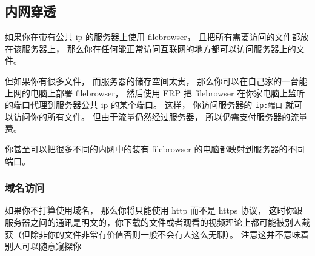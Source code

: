 \subsection{内网穿透}

如果你在带有公共 ip 的服务器上使用 filebrowser， 且把所有需要访问的文件都放在该服务器上， 那么你在任何能正常访问互联网的地方都可以访问服务器上的文件。

但如果你有很多文件， 而服务器的储存空间太贵， 那么你可以在自己家的一台能上网的电脑上部署 filebrowser， 然后使用 FRP 把 filebrowser 在你家电脑上监听的端口代理到服务器公共 ip 的某个端口。 这样， 你访问服务器的 \verb|ip:端口| 就可以访问你的所有文件。 但由于流量仍然经过服务器， 所以仍需支付服务器的流量费。

你甚至可以把很多不同的内网中的装有 filebrowser 的电脑都映射到服务器的不同端口。

\subsubsection{域名访问}
如果你不打算使用域名， 那么你将只能使用 http 而不是 https 协议， 这时你跟服务器之间的通讯是明文的，你下载的文件或者观看的视频理论上都可能被别人截获（但除非你的文件非常有价值否则一般不会有人这么无聊）。 注意这并不意味着别人可以随意窥探你
